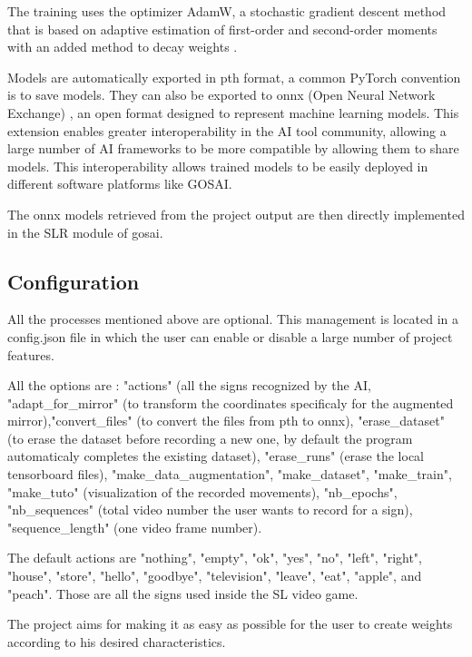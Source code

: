 The training uses the optimizer AdamW, a stochastic gradient descent method that is based on adaptive estimation of first-order and second-order moments with an added method to decay weights \cite{loshchilov2017decoupled}. 

Models are automatically exported in pth format, a common PyTorch convention is to save models. They can also be exported to onnx (Open Neural Network Exchange) \cite{onnx}, an open format designed to represent machine learning models. This extension enables greater interoperability in the AI tool community, allowing a large number of AI frameworks to be more compatible by allowing them to share models. This interoperability allows trained models to be easily deployed in different software platforms like GOSAI.

The onnx models retrieved from the project output are then directly implemented in the SLR module of gosai.


\subsection{Configuration}

All the processes mentioned above are optional. This management is located in a config.json file in which the user can enable or disable a large number of project features. 

All the options are : "actions" (all the signs recognized by the AI, "adapt\_for\_mirror" (to transform the coordinates specificaly for the augmented mirror),"convert\_files" (to convert the files from pth to onnx), "erase\_dataset" (to erase the dataset before recording a new one, by default the program automaticaly completes the existing dataset), "erase\_runs" (erase the local tensorboard files), "make\_data\_augmentation", "make\_dataset", "make\_train", "make\_tuto"  (visualization of the recorded movements), "nb\_epochs", "nb\_sequences" (total video number the user wants to record for a sign), "sequence\_length" (one video frame number).

The default actions are "nothing", "empty", "ok", "yes", "no", "left", "right", "house", "store", "hello", "goodbye", "television", "leave", "eat", "apple", and "peach". Those are all the signs used inside the SL video game.

The project aims for making it as easy as possible for the user to create weights according to his desired characteristics.

